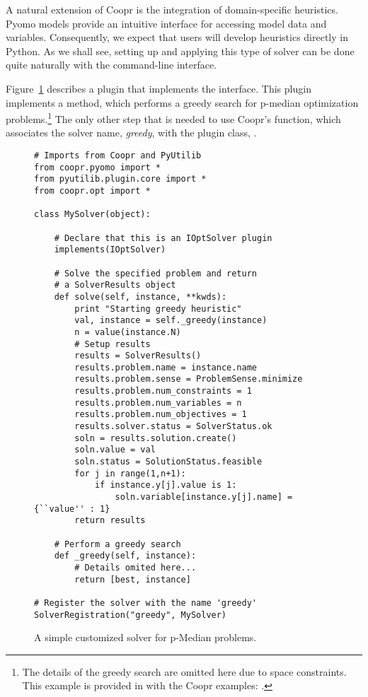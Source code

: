 A natural extension of Coopr is the integration of domain-specific
heuristics.  Pyomo models provide an intuitive interface for accessing
model data and variables.  Consequently, we expect that users will develop heuristics directly in Python.  As we shall see, setting up and applying 
this type of solver can be done quite naturally with the  command-line interface.

Figure~\ref{fig:greedy} describes a plugin that implements the  interface.  This plugin implements a  method,
which performs a greedy search for p-median optimization problems.\footnote{The details of the greedy search are omitted here due to space constraints.  This
example is provided in with the Coopr examples: .}  The only other step that is needed to use Coopr's  function, which associates the solver name, \textit{greedy}, with the plugin class, .


\begin{figure}
\begin{lstlisting}
# Imports from Coopr and PyUtilib
from coopr.pyomo import *
from pyutilib.plugin.core import *
from coopr.opt import *

class MySolver(object):

    # Declare that this is an IOptSolver plugin
    implements(IOptSolver)

    # Solve the specified problem and return
    # a SolverResults object
    def solve(self, instance, **kwds):
        print "Starting greedy heuristic"
        val, instance = self._greedy(instance)
        n = value(instance.N)
        # Setup results
        results = SolverResults()
        results.problem.name = instance.name
        results.problem.sense = ProblemSense.minimize
        results.problem.num_constraints = 1
        results.problem.num_variables = n
        results.problem.num_objectives = 1
        results.solver.status = SolverStatus.ok
        soln = results.solution.create()
        soln.value = val
        soln.status = SolutionStatus.feasible
        for j in range(1,n+1):
            if instance.y[j].value is 1:
                soln.variable[instance.y[j].name] = {``value'' : 1}
        return results

    # Perform a greedy search
    def _greedy(self, instance):
        # Details omited here...
        return [best, instance]

# Register the solver with the name 'greedy'
SolverRegistration("greedy", MySolver)
\end{lstlisting}
\caption{\label{fig:greedy} A simple customized solver for p-Median problems.}
\end{figure}


